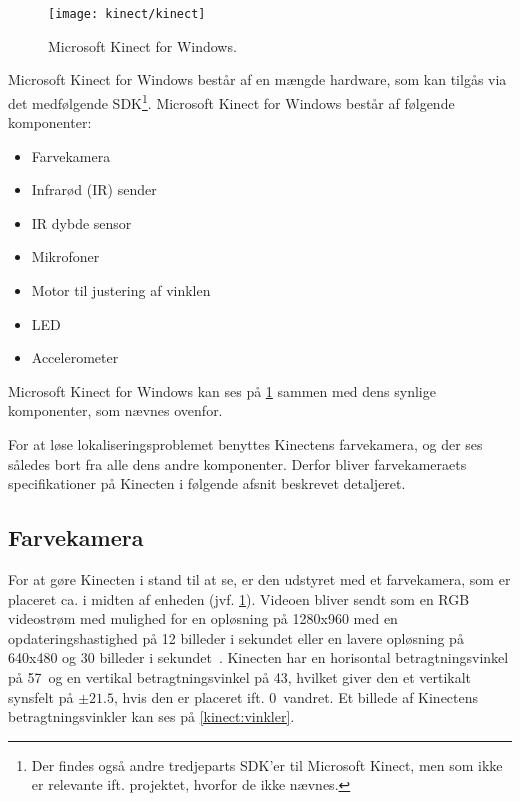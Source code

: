%

\begin{figure}
\centering
\texttt{[image: kinect/kinect]}
\caption{Microsoft Kinect for Windows.}
\label{kinect:opbygning}
\end{figure}

Microsoft Kinect for Windows består af en mængde hardware, som kan tilgås via det medfølgende SDK\footnote{Der findes også andre tredjeparts SDK'er til Microsoft Kinect, men som ikke er relevante ift. projektet, hvorfor de ikke nævnes.}.
Microsoft Kinect for Windows består af følgende komponenter:

\begin{itemize}
\item Farvekamera
\item Infrarød (IR) sender
\item IR dybde sensor
\item Mikrofoner
\item Motor til justering af vinklen
\item LED
\item Accelerometer
\end{itemize}

Microsoft Kinect for Windows kan ses på \cref{kinect:opbygning} sammen med dens synlige komponenter, som nævnes ovenfor.

For at løse lokaliseringsproblemet benyttes Kinectens farvekamera, og der ses således bort fra alle dens andre komponenter.
Derfor bliver farvekameraets specifikationer på Kinecten i følgende afsnit beskrevet detaljeret.

\subsection{Farvekamera}\label{kinect:farvekamera}
For at gøre Kinecten i stand til at se, er den udstyret med et farvekamera, som er placeret ca. i midten af enheden (jvf. \cref{kinect:opbygning}).
Videoen bliver sendt som en RGB videostrøm med mulighed for en opløsning på 1280x960 med en opdateringshastighed på 12 billeder i sekundet eller en lavere opløsning på 640x480 og 30 billeder i sekundet~\cite{kinectForWindowsFeatures}.
Kinecten har en horisontal betragtningsvinkel på 57\degree~og en vertikal betragtningsvinkel på 43\degree, hvilket giver den et vertikalt synsfelt på $\pm 21.5$\degree, hvis den er placeret ift. 0\degree~vandret.
Et billede af Kinectens betragtningsvinkler kan ses på \cref{kinect:vinkler}.

